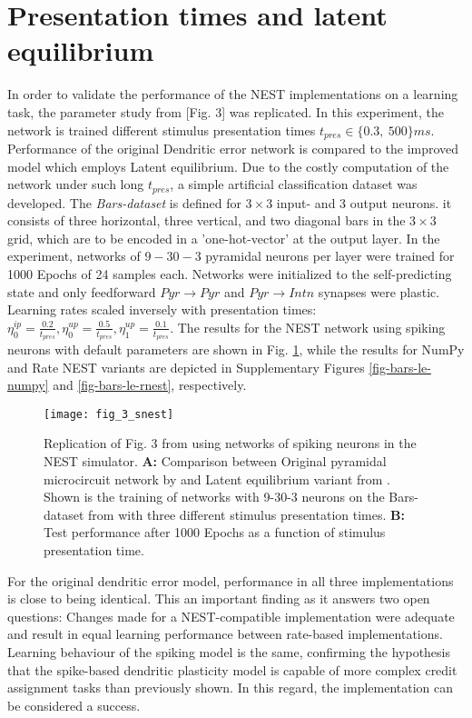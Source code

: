 \section{Presentation times and latent equilibrium}\label{sec-le-tpres}

In order to validate the performance of the NEST implementations on a learning task, the parameter study from
\citep{Haider2021}[Fig. 3] was replicated. In this experiment, the network is trained different stimulus presentation
times $t_{pres} \in \{0.3,\ 500\}ms$. Performance of the original Dendritic error network is compared to the improved
model which employs Latent equilibrium. Due to the costly computation of the network under such long $t_{pres}$, a
simple artificial classification dataset was developed. The \textit{Bars-dataset} is defined for $3\times3$ input- and
$3$ output neurons. it consists of three horizontal, three vertical, and two diagonal bars in the $3\times3$ grid, which
are to be encoded in a 'one-hot-vector' at the output layer. In the experiment, networks of $9-30-3$ pyramidal neurons
per layer were trained for 1000 Epochs of 24 samples each. Networks were initialized to the self-predicting state and
only feedforward $Pyr\rightarrow Pyr$ and $Pyr \rightarrow Intn$ synapses were plastic. Learning rates scaled inversely with
presentation times: $\eta^{ip}_0 = \frac{0.2}{t_{pres}}, \eta^{up}_0 = \frac{0.5}{t_{pres}}, \eta^{up}_1 =
\frac{0.1}{t_{pres}}$. The results for the NEST network using spiking neurons with default parameters
 are shown in Fig. \ref{fig-bars-le-snest}, while the results for NumPy and Rate NEST variants
are depicted in Supplementary Figures \ref{fig-bars-le-numpy} and \ref{fig-bars-le-rnest}, respectively.


\begin{figure}[h]
    \centering
    \texttt{[image: fig\_3\_snest]}
    \caption{Replication of Fig. 3 from \cite{Haider2021} using networks of spiking neurons in the NEST simulator.
        \textbf{A:} Comparison between Original pyramidal microcircuit network by \cite{sacramento2018dendritic} and
        Latent equilibrium variant from \cite{Haider2021}. Shown is the training of networks with 9-30-3 neurons on the
        Bars-dataset from with three different stimulus presentation times. \textbf{B:} Test
        performance after 1000 Epochs as a function of stimulus presentation time. }
    \label{fig-bars-le-snest}
\end{figure}

For the original dendritic error model, performance in all three implementations is close to being identical. This an
important finding as it answers two open questions: Changes made for a NEST-compatible implementation were adequate and
result in equal learning performance between rate-based implementations. Learning behaviour of the spiking model is the
same, confirming the hypothesis that the spike-based dendritic plasticity model is capable of more complex credit
assignment tasks than previously shown. In this regard, the implementation can be considered a success. 

